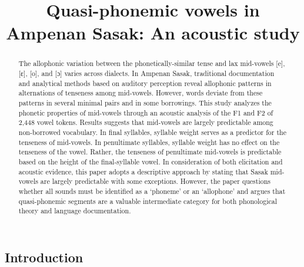 \documentclass[12pt]{ouparticle}
\title{Quasi-phonemic vowels in Ampenan Sasak: An acoustic study}
\begin{document}
\maketitle

\begin{abstract}

The allophonic variation between the phonetically-similar tense and lax mid-vowels [e], [ɛ], [o], and [ɔ] varies across dialects. In Ampenan Sasak, traditional documentation and analytical methods based on auditory perception reveal allophonic patterns in alternations of tenseness among mid-vowels. However, words deviate from these patterns in several minimal pairs and in some borrowings. This study analyzes the phonetic properties of mid-vowels through an acoustic analysis of the F1 and F2 of 2,448 vowel tokens. Results suggests that mid-vowels are largely predictable among non-borrowed vocabulary. In final syllables, syllable weight serves as a predictor for the tenseness of mid-vowels. In penultimate syllables, syllable weight has no effect on the tenseness of the vowel. Rather, the tenseness of penultimate mid-vowels is predictable based on the height of the final-syllable vowel. In consideration of both elicitation and acoustic evidence, this paper adopts a descriptive approach by stating that Sasak mid-vowels are largely predictable with some exceptions. However, the paper questions whether all sounds must be identified as a ‘phoneme’ or an ‘allophone’ and argues that quasi-phonemic segments are a valuable intermediate category for both phonological theory and language documentation. 


\end{abstract}

\newpage



\subsection{Introduction}\label{sec:introduction}
\end{document}
